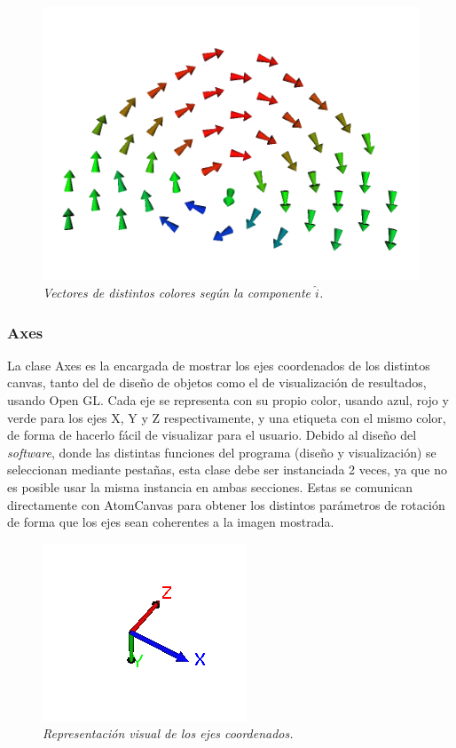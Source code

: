 \begin{figure}[ht]
  \centering
  \includegraphics[scale=.3]{images/atomCanvas-vectores-colores}
  \caption{\em Vectores de distintos colores según la componente $\hat{i}$.}
  \label{atomCanvas-vectores-colores}
\end{figure}

\subsubsection{Axes}

La clase Axes es la encargada de mostrar los ejes coordenados de los distintos canvas, tanto del de diseño de objetos como el de visualización de resultados, usando Open GL.
Cada eje se representa con su propio color, usando azul, rojo y verde para los ejes X, Y y Z respectivamente, y una etiqueta con el mismo color, de forma de hacerlo fácil de visualizar para el usuario.
Debido al diseño del \emph{software}, donde las distintas funciones del programa (diseño y visualización) se seleccionan mediante pestañas, esta clase debe ser instanciada 2 veces, ya que no es posible usar la misma instancia en ambas secciones. Estas se comunican directamente con AtomCanvas para obtener los distintos parámetros de rotación de forma que los ejes sean coherentes a la imagen mostrada.

\begin{figure}[ht]
  \centering
  \includegraphics[scale=1]{images/axes}
  \caption{\em Representación visual de los ejes coordenados.}
\end{figure}

